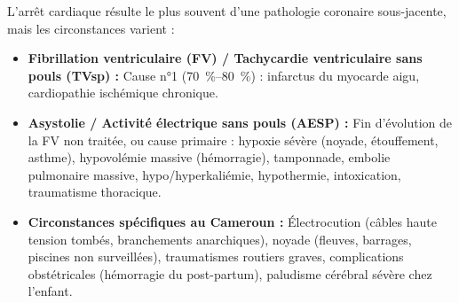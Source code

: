 \documentclass[11pt]{article}
\begin{document}
\begin{propriete}
L'arrêt cardiaque résulte le plus souvent d'une pathologie coronaire sous-jacente, mais les circonstances varient :
\begin{itemize}
    \item \textbf{Fibrillation ventriculaire (FV) / Tachycardie ventriculaire sans pouls (TVsp) :} Cause n°1 (\SIrange{70}{80}{\%}) : infarctus du myocarde aigu, cardiopathie ischémique chronique.
    \item \textbf{Asystolie / Activité électrique sans pouls (AESP) :} Fin d'évolution de la FV non traitée, ou cause primaire : hypoxie sévère (noyade, étouffement, asthme), hypovolémie massive (hémorragie), tamponnade, embolie pulmonaire massive, hypo/hyperkaliémie, hypothermie, intoxication, traumatisme thoracique.
    \item \textbf{Circonstances spécifiques au Cameroun :} Électrocution (câbles haute tension tombés, branchements anarchiques), noyade (fleuves, barrages, piscines non surveillées), traumatismes routiers graves, complications obstétricales (hémorragie du post-partum), paludisme cérébral sévère chez l'enfant.
\end{itemize}
\end{propriete}
\end{document}
